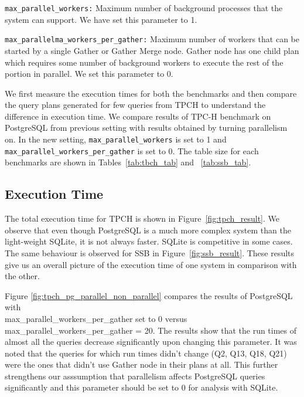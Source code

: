 \texttt{max\_parallel\_workers:} Maximum number of background processes that the system can support.
We have set this parameter to 1.

\texttt{max\_parallelma\_workers\_per\_gather:} Maximum number of workers that can be started by a single Gather or Gather Merge node. Gather node has one child plan which requires some number of background workers to execute the rest of the portion in parallel. We set this parameter to 0.

We first measure the execution times for both the benchmarks and then compare the query plans generated for few queries from TPCH to understand the difference in execution time.
We compare results of TPC-H benchmark on PostgreSQL from previous setting with results obtained by turning parallelism on. In the new setting, \texttt{max\_parallel\_workers} is set to 1 and \texttt{max\_parallel\_workers\_per\_gather} is set to 0. The table size for each benchmarks are shown in Tables~\ref{tab:tbch_tab} and ~\ref{tab:ssb_tab}.

\subsection{Execution Time}
\label{sec:time}


The total execution time for TPCH is shown in Figure~\ref{fig:tpch_result}. We observe that even though PostgreSQL is a much more complex system than the light-weight SQLite, it is not always faster. SQLite is competitive in some cases. The same behaviour is observed for SSB in Figure~\ref{fig:ssb_result}. These results give us an overall picture of the execution time of one system in comparison with the other.

Figure \ref{fig:tpch_pg_parallel_non_parallel} compares the results of PostgreSQL with \\ max\_parallel\_workers\_per\_gather set to 0 versus \\ max\_parallel\_workers\_per\_gather = 20. The results show that the run times of almost all the queries decrease significantly upon changing this parameter. It was noted that the queries for which run times didn't change (Q2, Q13, Q18, Q21) were the ones that didn't use Gather node in their plans at all. This further strengthens our asssumption that parallelism affects PostgreSQL queries significantly and this parameter should be set to 0 for analysis with SQLite.



